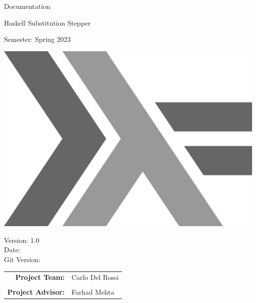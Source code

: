 \begin{titlepage}

    \begin{center}


        \vspace{1 cm}

        {\Large Documentation} \\

        \vspace{0.5cm}

        {\Huge Haskell Substitution Stepper}

        \vspace{0.5cm}

        Semester: Spring 2023

        \vspace{1 cm}

        \includegraphics[scale=0.1]{resources/haskell-logo.png}

        \vspace{1 cm}

        Version: 1.0 \\
        Date: \DTMnow \\
        Git Version: \gitDescription
        \vspace{1 cm}

        \begin{tabular}{rl}
            \textbf{Project Team:}    & Carlo Del Rossi \\
                                      &                    \\
            \textbf{Project Advisor:} & Farhad Mehta
        \end{tabular}


\end{center}
\end{titlepage}
